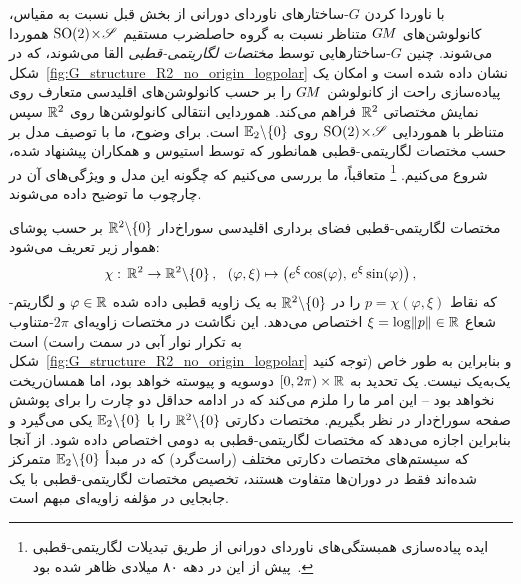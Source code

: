 با ناوردا کردن $G$-ساختارهای ناوردای دورانی از بخش قبل نسبت به مقیاس، کانولوشن‌های $G\mkern-1.4muM$ متناظر نسبت به گروه حاصلضرب مستقیم ${\operatorname{SO}(2) \!\times\! \mathscr{S}}$ هموردا می‌شوند.
چنین $G$-ساختارهایی توسط \emph{مختصات لگاریتمی-قطبی} القا می‌شوند، که در شکل~\ref{fig:G_structure_R2_no_origin_logpolar} نشان داده شده است و امکان یک پیاده‌سازی راحت از کانولوشن $G\mkern-1.4muM$ را بر حسب کانولوشن‌های اقلیدسی متعارف روی نمایش مختصاتی $\mathbb{R}^2$ فراهم می‌کند.
هموردایی انتقالی کانولوشن‌ها روی $\mathbb{R}^2$ سپس متناظر با هموردایی ${\operatorname{SO}(2) \!\times\! \mathscr{S}}$ روی $\mathbb{E}_2 \backslash \{0\}$ است.
برای وضوح، ما با توصیف مدل بر حسب مختصات لگاریتمی-قطبی همانطور که توسط استیوس و همکاران\cite{esteves2017polar} پیشنهاد شده، شروع می‌کنیم.%
\footnote{
	ایده پیاده‌سازی همبستگی‌های ناوردای دورانی از طریق تبدیلات لگاریتمی-قطبی پیش از این در دهه ۸۰ میلادی ظاهر شده بود~\cite{saito1983scale,casasent1987real}.
}
متعاقباً، ما بررسی می‌کنیم که چگونه این مدل و ویژگی‌های آن در چارچوب ما توضیح داده می‌شوند.

مختصات لگاریتمی-قطبی فضای برداری اقلیدسی سوراخ‌دار $\mathbb{R}^2 \backslash \{0\}$ بر حسب پوشای هموار زیر تعریف می‌شود:
\begin{align}
	\chi:\, \R^2 \to \R^2 \backslash \{0\} \,,\ \ 
	(\varphi, \xi) \mapsto \big( e^\xi \cos(\varphi) ,\, e^\xi \sin(\varphi) \big) \,,
\end{align}
که نقاط $p = \chi(\varphi,\xi)$ را در $\mathbb{R}^2 \backslash \{0\}$ به یک زاویه قطبی داده شده $\varphi \in \mathbb{R}$ و لگاریتم-شعاع ${\xi = \log\lVert p\rVert \in \mathbb{R}}$ اختصاص می‌دهد.
این نگاشت در مختصات زاویه‌ای $2\pi$-متناوب است (به تکرار نوار آبی در سمت راست شکل~\ref{fig:G_structure_R2_no_origin_logpolar} توجه کنید) و بنابراین به طور خاص یک‌به‌یک نیست.
یک تحدید به $[0,2\pi) \times \mathbb{R}$ دوسویه و پیوسته خواهد بود، اما همسان‌ریخت نخواهد بود -- این امر ما را ملزم می‌کند که در ادامه حداقل دو چارت را برای پوشش صفحه سوراخ‌دار در نظر بگیریم.
مختصات دکارتی $\mathbb{R}^2 \backslash \{0\}$ را با $\mathbb{E}_2 \backslash \{0\}$ یکی می‌گیرد و بنابراین اجازه می‌دهد که مختصات لگاریتمی-قطبی به دومی اختصاص داده شود.
از آنجا که سیستم‌های مختصات دکارتی مختلف (راست‌گرد) که در مبدأ $\mathbb{E}_2 \backslash \{0\}$ متمرکز شده‌اند فقط در دوران‌ها متفاوت هستند، تخصیص مختصات لگاریتمی-قطبی با یک جابجایی در مؤلفه زاویه‌ای مبهم است.

